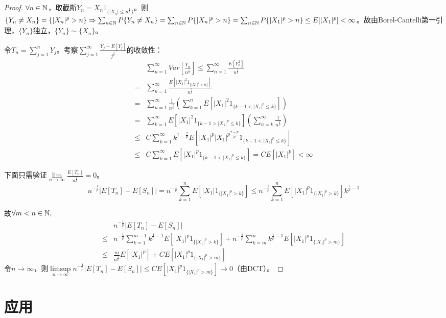 \documentclass{ctexbook}
\begin{document}
\begin{proof}
  $\forall n\in\mathbb{N}$，取截断$Y_{n}=X_{n}1_{\{|X_{n}|\leq n^{\frac 1 p}\}}$。则$\{Y_{n}\neq X_{n}\}=\{|X_{n}|^{p}>n\}\Rightarrow \sum_{n\in\mathbb{N}} P\{Y_{n}\neq X_{n}\}=\sum_{n\in\mathbb{N}} P\{|X_{n}|^{p}>n\}=\sum_{n\in\mathbb{N}} P\{|X_{1}|^{p}>n\}\leq E[|X_{1}|^{p}]<\infty$。故由Borel-Cantelli第一引理，$\{Y_{n}\}$独立，$\{Y_{n}\}\sim \{X_{n}\}$。

  令$T_{n}=\sum_{j=1}^{n}Y_{j}$。考察$\sum_{j=1}^{\infty}\frac{Y_{j}-E[Y_{j}]}{j^{\frac 1 p}}$的收敛性：
  \begin{align*}
    &\sum_{n=1}^{\infty}Var[\frac{Y_{n}}{n^{\frac 1 p}}]\leq \sum_{n=1}^{\infty}\frac{E[Y_{n}^{2}]}{n^{\frac 2 p}}\\
    =&\sum_{n=1}^{\infty}\frac{E[|X_{1}|^{2}1_{\{|X_{1}|^{p}>n\}}]}{n^{\frac 2 p}}\\
    =&\sum_{n=1}^{\infty}\frac{1}{n^{\frac 2 p}}(\sum_{k=1}^{n}E[|X_{1}|^{2}1_{\{k-1<|X_{1}|^{p}\leq k\}}])\\
    =&\sum_{k=1}^{\infty}E[|X_{1}|^{2}1_{\{k-1>|X_{1}|^{p}\leq k\}}](\sum_{n=k}^{\infty}\frac{1}{n^{\frac 2 p}})\\
    \leq& C\sum_{k=1}^{\infty}k^{1-\frac{2}{p}}E[|X_{1}|^{p}|X_{1}|^{p\frac{2-p}{p}}1_{\{k-1<|X_{1}|^{p}\leq k\}}]\\
    \leq& C\sum_{k=1}^{\infty}E[|X_{1}|^{p}1_{\{k-1<|X_{1}|^p\leq k\}}]=CE[|X_{1}|^{p}]<\infty
  \end{align*}

  下面只需验证$\lim\limits_{n\to\infty}\frac{E[T_{n}]}{n^{\frac 1 p}}= 0$。
  \[n^{-\frac 1 p}|E[T_{n}]-E[S_{n}]|=n^{-\frac 1 p}\sum_{k=1}^{n}E[|X_{1}|1_{\{|X_{1}|^{p}>k\}}]\leq n^{-\frac 1 p}\sum_{k=1}^{n}E[|X_{1}|^{p}1_{\{|X_{1}|^{p}>k\}}]k^{\frac{1}{p}-1}\]

  故$\forall m<n\in\mathbb{N}, $
  \begin{align*}
    &n^{-\frac 1 p}|E[T_{n}]-E[S_{n}]|\\
    \leq& n^{-\frac 1 p}\sum_{k=1}^{m-1}k^{\frac{1}{p}-1}E[|X_{1}|^{p}1_{\{|X_{1}|^{p}>k\}}]+n^{-\frac 1 p}\sum_{k=m}^{n}k^{\frac{1}{p}-1}E[|X_{1}|^{p}1_{\{|X_{1}|^{p}>m\}}]\\
    \leq& \frac{m}{n^{\frac{1}{p}}}E[|X_{1}|^{p}]+CE[|X_{1}|^{p}1_{\{|X_{1}|^{p}>m\}}]
  \end{align*}
  令$n\to\infty$，则$\limsup\limits_{n\to\infty} n^{-\frac 1 p}|E[T_{n}]-E[S_{n}]|\leq CE[|X_{1}|^{p}1_{\{|X_{1}|^{p}>m\}}]\to 0$（由DCT）。
\end{proof}

\section{应用}
\end{document}
